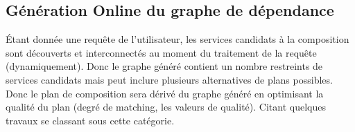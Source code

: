 

  \subsection{Génération Online du graphe de dépendance}
  \label{sec:generation-online}
  \begin{text} %
    {\'E}tant donnée une requête de l'utilisateur, les services candidats
    à la composition sont découverts et interconnectés au moment du
    traitement de la requête (dynamiquement). Donc le graphe généré
    contient un nombre restreints de services candidats mais peut
    inclure plusieurs alternatives de plans possibles. Donc le plan de
    composition sera dérivé du graphe généré en optimisant la qualité
    du plan (degré de matching, les valeurs de qualité). Citant
    quelques travaux se classant sous cette catégorie.
  \end{text}

